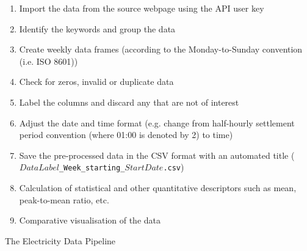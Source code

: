 \documentclass[energies,article,submit,moreauthors,pdftex]{Definitions/mdpi}
\begin{document}


\begin{algorithm}[H]
\SetAlgoLined
{}
\begin{enumerate}
    \item Import the data from the source webpage using the API user key
    \item Identify the keywords and group the data
    \item Create weekly data frames (according to the Monday-to-Sunday convention (i.e. ISO 8601))
    \item Check for zeros, invalid or duplicate data
    \item Label the columns and discard any that are not of interest
    \item Adjust the date and time format (e.g. change from half-hourly settlement period convention (where 01:00 is denoted by 2) to time)
    \item Save the pre-processed data in the CSV format with an automated title  (\texttt{$DataLabel$\_Week\_starting\_$StartDate$.csv})
    \item Calculation of statistical and other quantitative descriptors such as mean, peak-to-mean ratio, etc.
    \item Comparative visualisation of the data
\end{enumerate}
 
 \caption{The Electricity Data Pipeline}
\end{algorithm}
\end{document}
